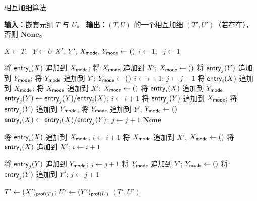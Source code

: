 \begin{BreakableAlgorithm}{相互加细算法}\label{mutualrefinementalgorithm}
\begin{algorithmic}[1]
\State \textbf{输入：}嵌套元组 $T$ 与 $U$。
\State \textbf{输出：}$(T,U)$ 的一个相互加细 $(T',U')$（若存在），否则 $\mathbf{None}$。
\algsep

\State $X \gets T$; \ $Y \gets U$
\State $X',\, Y',\, X_{\mathsf{mode}},\, Y_{\mathsf{mode}} \gets ()$
\State $i \gets 1$; \ $j \gets 1$

    \State 将 $\mathsf{entry}_i(X)$ 追加到 $X_{\mathsf{mode}}$;
    将 $X_{\mathsf{mode}}$ 追加到 $X'$;
    $X_{\mathsf{mode}}\gets()$
    \State 将 $\mathsf{entry}_j(Y)$ 追加到 $Y_{\mathsf{mode}}$;
    \State 将 $Y_{\mathsf{mode}}$ 追加到 $Y'$;
    \State $Y_{\mathsf{mode}}\gets()$
    \State $i \gets i+1$;
    \State $j \gets j+1$
    \State 将 $\mathsf{entry}_i(X)$ 追加到 $X_{\mathsf{mode}}$;
    \State 将 $X_{\mathsf{mode}}$ 追加到 $X'$;
    \State $X_{\mathsf{mode}}\gets()$
    \State 将 $\mathsf{entry}_i(X)$ 追加到 $Y_{\mathsf{mode}}$
    \State $\mathsf{entry}_j(Y) \gets \mathsf{entry}_j(Y)/\mathsf{entry}_i(X)$;
    \State $i \gets i+1$
    \State 将 $\mathsf{entry}_j(Y)$ 追加到 $X_{\mathsf{mode}}$;
    \State 将 $\mathsf{entry}_j(Y)$ 追加到 $Y_{\mathsf{mode}}$;
    \State 将 $Y_{\mathsf{mode}}$ 追加到 $Y'$;
    \State $Y_{\mathsf{mode}}\gets()$
    \State $\mathsf{entry}_i(X) \gets \mathsf{entry}_i(X)/\mathsf{entry}_j(Y)$;
    \State $j \gets j+1$
  \Else
    \State \Return $\mathbf{None}$
  \EndIf
\EndWhile

    \State 将 $\mathsf{entry}_i(X)$ 追加到 $X_{\mathsf{mode}}$;
    \State $i \gets i+1$
  \EndIf
  \State 将 $X_{\mathsf{mode}}$ 追加到 $X'$;
  \State $X_{\mathsf{mode}}\gets()$
\EndIf
{}
  \State 将 $\mathsf{entry}_i(X)$ 追加到 $X'$;
  \State $i \gets i+1$
\EndWhile

    \State 将 $\mathsf{entry}_j(Y)$ 追加到 $Y_{\mathsf{mode}}$;
    \State $j \gets j+1$
  \EndIf
  \State 将 $Y_{\mathsf{mode}}$ 追加到 $Y'$;
  \State $Y_{\mathsf{mode}}\gets()$
\EndIf
{}
  \State 将 $\mathsf{entry}_j(Y)$ 追加到 $Y'$;
  \State $j \gets j+1$
\EndWhile

\State $T' \gets (X')_{\mathsf{prof}(T)}$;
\State $U' \gets (Y')_{\mathsf{prof}(U)}$
\State \Return $(T',U')$
\end{algorithmic}
\end{BreakableAlgorithm}


